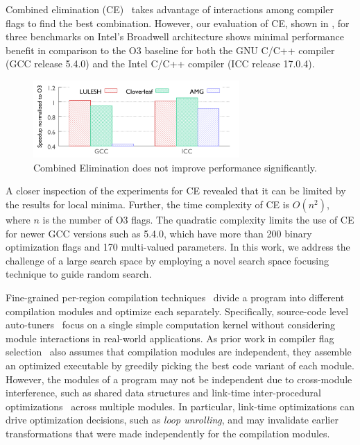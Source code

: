 Combined elimination (CE)~\cite{PanE06, Pan:2008:taco} takes advantage
of interactions among compiler flags to find the best combination.
However, our evaluation of CE, shown in , for three benchmarks on
Intel's Broadwell architecture shows minimal performance benefit in
comparison to the O3 baseline for both the GNU C/C++ compiler (GCC
release 5.4.0) and the Intel C/C++ compiler (ICC release 17.0.4).

\begin{figure}
\centering
\includegraphics[width=0.7\textwidth]{gnuplot_temp/intro.pdf}
\caption{Combined Elimination does not improve performance significantly.}
\label{fig:ce}
\end{figure}

%
A closer inspection of the experiments for CE revealed that it can
be limited by the results for local minima.  Further, the time
complexity of CE is $O(n^2)$, where $n$ is the number of O3 flags. The
quadratic complexity limits the use of CE for newer GCC versions such
as 5.4.0, which have more than 200 binary optimization flags and 170
multi-valued parameters.  In this work, we address the challenge of
a large search space by employing a novel search space focusing
technique to guide random search.

%
Fine-grained per-region compilation techniques~\cite{Pan:2008:taco,
  cere, chill, poet} divide a program into different compilation modules and
optimize each separately. 
%
Specifically, source-code level auto-tuners~\cite{chill, poet} focus
on a single simple computation kernel without considering module
interactions in real-world applications. As prior work in compiler flag
selection~\cite{Pan:2008:taco, cere} also assumes that compilation
modules are independent, they assemble an optimized executable by
greedily picking the best code variant of each module. However, the
modules of a program may not be independent due to cross-module
interference, such as shared data structures and link-time
inter-procedural optimizations~\cite{lto, lto2} across multiple
modules.  In particular, link-time optimizations can drive
optimization decisions, such as \emph{loop unrolling}, and may
invalidate earlier transformations that were made independently for
the compilation modules.

